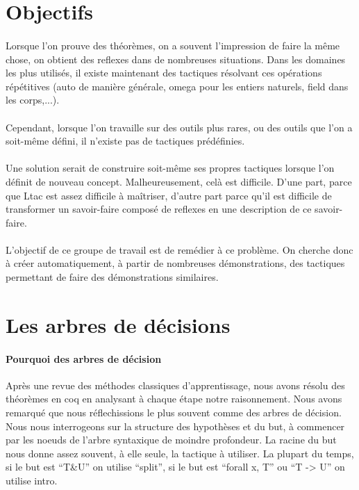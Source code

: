 
\section{Objectifs}
\paragraph{}
Lorsque l'on prouve des théorèmes, on a souvent l'impression de faire la même chose, on obtient des reflexes dans de nombreuses situations. Dans les domaines les plus utilisés, il existe maintenant des tactiques résolvant ces opérations répétitives (auto de manière générale, omega pour les entiers naturels, field dans les corps,...).

\paragraph{}
Cependant, lorsque l'on travaille sur des outils plus rares, ou des outils que l'on a soit-même défini, il n'existe pas de tactiques prédéfinies. 

\paragraph{}
Une solution serait de construire soit-même ses propres tactiques lorsque l'on définit de nouveau concept. Malheureusement, celà est difficile. D'une part, parce que Ltac est assez difficile à maîtriser, d'autre part parce qu'il est difficile de transformer un savoir-faire composé de reflexes en une description de ce savoir-faire.

\paragraph{}
L'objectif de ce groupe de travail est de remédier à ce problème. On cherche donc à créer automatiquement, à partir de nombreuses démonstrations, des tactiques permettant de faire des démonstrations similaires.

\section{Les arbres de décisions}

\paragraph{Pourquoi des arbres de décision}
Après une revue des méthodes classiques d'apprentissage, nous avons résolu des théorèmes en coq en analysant à chaque étape notre raisonnement. Nous avons remarqué que nous réflechissions le plus souvent comme des arbres de décision. Nous nous interrogeons sur la structure des hypothèses et du but, à commencer par les noeuds de l'arbre syntaxique de moindre profondeur. La racine du but nous donne assez souvent, à elle seule, la tactique à utiliser. La plupart du temps, si le but est ``T\&U'' on utilise ``split'', si le but est ``forall x, T'' ou ``T -> U'' on utilise intro.  

